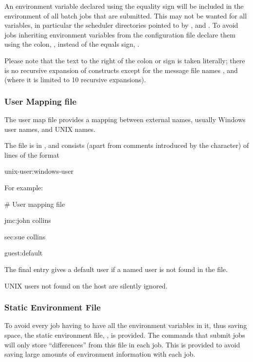 An environment variable declared using the equality sign \exampletext{=} will be included in the environment of all
batch jobs that are submitted. This may not be wanted for all variables, in particular the scheduler directories pointed to by
,  and . To avoid jobs inheriting environment
variables from the configuration file declare them using the colon, \exampletext{:} , instead of the equals sign,
\exampletext{=}.

Please note that the text to the right of the colon or \exampletext{=} sign is taken literally; there is no recursive
expansion of  constructs except for the message file names ,
 and  (where it is limited to 10 recursive expansions).

\subsubsection{User Mapping file}
The user map file provides a mapping between external names, usually Windows user names, and UNIX names.

The file is in \usermap, and consists (apart from comments introduced by the \filename{\#} character) of
lines of the format

\begin{expara}

unix-user:windows-user

\end{expara}

For example:

\begin{expara}

\# User mapping file

jmc:john collins

sec:sue collins

guest:default

\end{expara}

The final entry gives a default user if a named user is not found in the file.

UNIX users not found on the host are silently ignored.

\subsubsection{\manualProduct{} Static Environment File}
To avoid every job having to have all the environment variables in it, thus saving space, the static environment file,
\batchenv{}, is provided. The commands that submit jobs will only store ``differences'' from this file in each job.
This is provided to avoid saving large amounts of environment information with each job.

